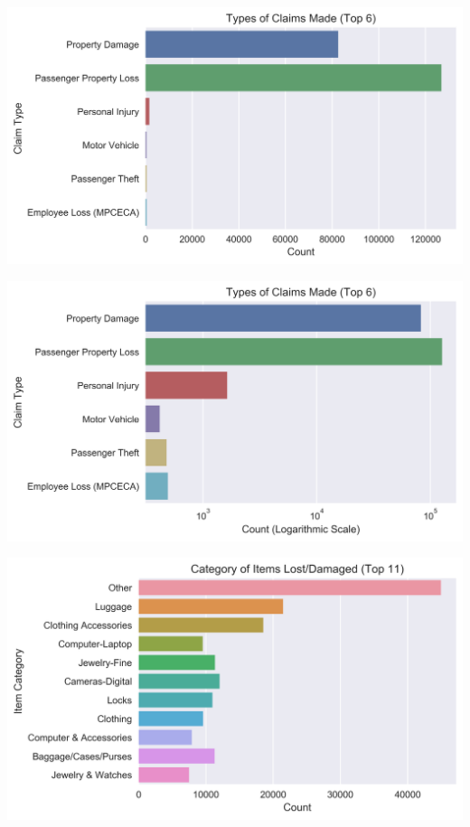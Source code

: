 \documentclass{beamer}
\begin{document}
\begin{frame}
	\includegraphics[keepaspectratio, width = \textwidth, height = 0.5\textheight]{../plots/type}
	\begin{flushright}
		\includegraphics[keepaspectratio, width = \textwidth, height = 0.5\textheight]{../plots/log_type}
	\end{flushright}
\end{frame}

\begin{frame}
	\includegraphics[keepaspectratio, width = \textwidth, height = \textheight]{../plots/items}
\end{frame}
\end{document}
